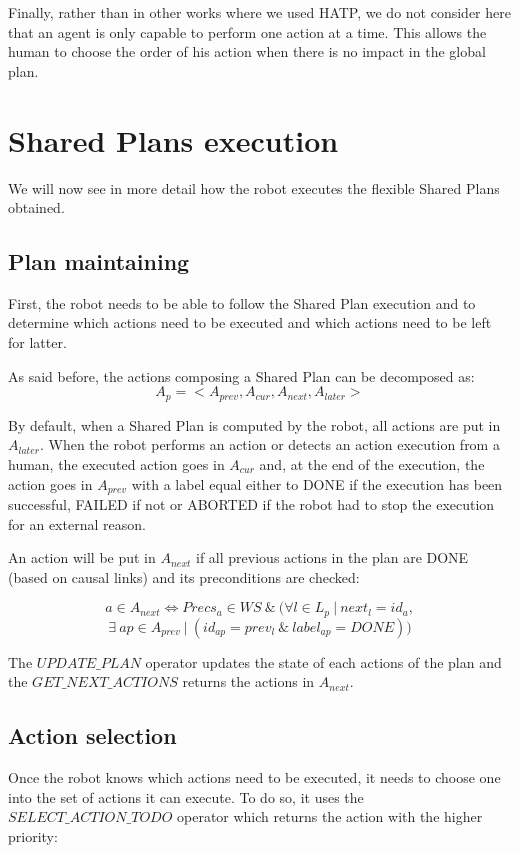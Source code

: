 \documentclass[english,a4paper,11pt,twoside]{StyleThese}
\begin{document}
Finally, rather than in other works where we used HATP, we do not consider here that an agent is only capable to perform one action at a time. This allows the human to choose the order of his action when there is no impact in the global plan.

\section{Shared Plans execution}

We will now see in more detail how the robot executes the flexible Shared Plans obtained.

\subsection{Plan maintaining}
\label{subsec:maintaining}

First, the robot needs to be able to follow the Shared Plan execution and to determine which actions need to be executed and which actions need to be left for latter. 

As said before, the actions composing a Shared Plan can be decomposed as:
$$A_p = <A_{prev}, A_{cur}, A_{next}, A_{later}>$$

By default, when a Shared Plan is computed by the robot, all actions are put in $A_{later}$. When the robot performs an action or detects an action execution from a human, the executed action goes in $A_{cur}$ and, at the end of the execution, the action goes in $A_{prev}$ with a label equal either to DONE if the execution has been successful, FAILED if not or ABORTED if the robot had to stop the execution for an external reason.

An action will be put in $A_{next}$ if all previous actions in the plan are DONE (based on causal links) and its preconditions are checked:

$$a \in A_{next} \Leftrightarrow Precs_{a} \in WS \ \& \ (\forall l \in L_p \ | \ next_l = id_a,$$ 
$$\exists \ ap \in A_{prev} \ | \ (id_{ap} = prev_l \ \& \ label_{ap}  = DONE))$$

The $UPDATE\_PLAN$ operator updates the state of each actions of the plan and the $GET\_NEXT\_ACTIONS$ returns the actions in $A_{next}$.


\subsection{Action selection}
\label{subsec:selection}

Once the robot knows which actions need to be executed, it needs to choose one into the set of actions it can execute. To do so, it uses the $SELECT\_ACTION\_TODO$ operator which returns the action with the higher priority:
\end{document}
